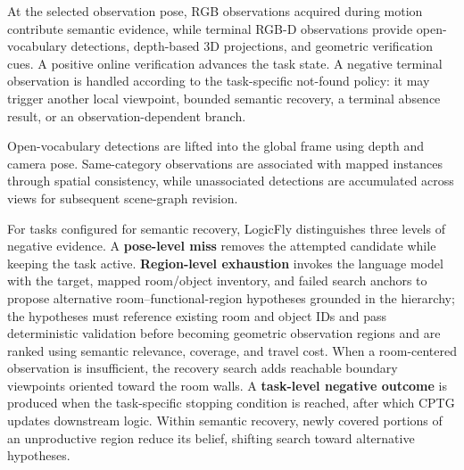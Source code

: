 \documentclass[letterpaper,10pt,journal]{IEEEtran}
\begin{document}
At the selected observation pose, RGB observations acquired during motion contribute semantic evidence, while terminal RGB-D observations provide open-vocabulary detections, depth-based 3D projections, and geometric verification cues. A positive online verification advances the task state. A negative terminal observation is handled according to the task-specific not-found policy: it may trigger another local viewpoint, bounded semantic recovery, a terminal absence result, or an observation-dependent branch.

Open-vocabulary detections are lifted into the global frame using depth and camera pose. Same-category observations are associated with mapped instances through spatial consistency, while unassociated detections are accumulated across views for subsequent scene-graph revision.

For tasks configured for semantic recovery, LogicFly distinguishes three levels of negative evidence. A \textbf{pose-level miss} removes the attempted candidate while keeping the task active. \textbf{Region-level exhaustion} invokes the language model with the target, mapped room/object inventory, and failed search anchors to propose alternative room--functional-region hypotheses grounded in the hierarchy; the hypotheses must reference existing room and object IDs and pass deterministic validation before becoming geometric observation regions and are ranked using semantic relevance, coverage, and travel cost. When a room-centered observation is insufficient, the recovery search adds reachable boundary viewpoints oriented toward the room walls. A \textbf{task-level negative outcome} is produced when the task-specific stopping condition is reached, after which CPTG updates downstream logic. Within semantic recovery, newly covered portions of an unproductive region reduce its belief, shifting search toward alternative hypotheses.
\end{document}
